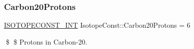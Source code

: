 \subsubsection{\texorpdfstring{Carbon20\+Protons}{Carbon20Protons}}
{\footnotesize\ttfamily \mbox{\hyperlink{group___isotope_const-_macros_ga5f18360b3e99483a35c32d789e62621c}{I\+S\+O\+T\+O\+P\+E\+C\+O\+N\+S\+T\+\_\+\+I\+NT}} Isotope\+Const\+::\+Carbon20\+Protons = 6}

\$ \$ Protons in Carbon-\/20. 